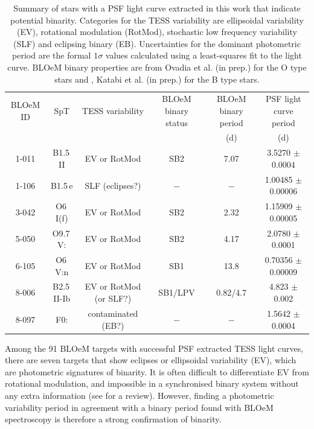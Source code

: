 \documentclass[fleqn,usenatbib]{mnras}
\begin{document}
\begin{table}
\centering
\caption{Summary of stars with a PSF light curve extracted in this work that indicate potential binarity. Categories for the TESS variability are ellipsoidal variability (EV), rotational modulation (RotMod), stochastic low frequency variability (SLF) and eclipsing binary (EB). Uncertainties for the dominant photometric period are the formal $1\sigma$ values calculated using a least-squares fit to the light curve. BLOeM binary properties are from {\color{blue} Ovadia et al.} (in prep.) for the O type stars and \citet{Britavskiy+2025}, {\color{blue}Katabi et al.}  (in prep.) for the B type stars.}
\begin{tabular}{c c c c c c}
\hline
BLOeM ID & SpT & TESS variability & BLOeM binary status & BLOeM binary period & PSF light curve period \\
& & & & (d) & (d) \\
\hline
1-011 & B1.5\,II & EV or RotMod & SB2 & 7.07 & 3.5270 $\pm$ 0.0004 \\
1-106 & B1.5\,e & SLF (eclipses?) & $-$ & $-$ %
& 1.00485 $\pm$ 0.00006 \\
3-042 & O6\,I(f) & EV or RotMod & SB2 &  2.32  & 1.15909 $\pm$ 0.00005\\
5-050 & O9.7\,V: & EV or RotMod & SB2 &  4.17  & 2.0780 $\pm$ 0.0001\\
6-105 & O6\,V:n & EV or RotMod & SB1 & 13.8  & 0.70356 $\pm$ 0.00009\\

8-006 & B2.5\,II-Ib & EV or RotMod (or SLF?) & SB1/LPV & 0.82/4.7 &  4.823 $\pm$ 0.002\\
8-097 & F0: & contaminated (EB?) & $-$ & $-$%
& 1.5642 $\pm$ 0.0004 \\
\hline
\end{tabular}
\label{table:binaries}
\end{table}


Among the 91 BLOeM targets with successful PSF extracted TESS light curves, there are seven targets that show eclipses or ellipsoidal variability (EV), which are photometric signatures of binarity. It is often difficult to differentiate EV from rotational modulation, and impossible in a synchronised binary system without any extra information (see \citealt{SouthworthBowman2025} for a review). However, finding a photometric variability period in agreement with a binary period found with BLOeM spectroscopy is therefore a strong confirmation of binarity.
\end{document}
